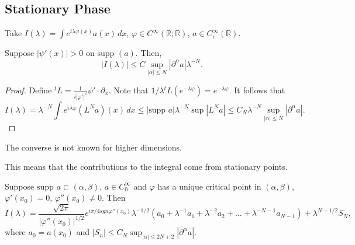 \documentclass[12pt]{scrartcl}
\newcommand{\R}{\mathbb{R}}
\newcommand{\<}{\langle}
\renewcommand{\>}{\rangle}
\let \phi \varphi
\newcommand{\supp}{\text{supp }}
\begin{document}
\subsection{Stationary Phase}
Take $I(\lambda) = \int e^{i\lambda \phi(x)} a(x)\,dx$, $\phi \in C^\infty(\R; \R)$, $a \in C_c^\infty(\R)$.  
\begin{lemma} Suppose $|\psi'(x)| > 0$ on $\supp(a)$.  Then,
$$|I(\lambda)| \le C \sup_{|\alpha| \le N} |\partial^\alpha a| \lambda^{-N}.$$
\end{lemma}
\begin{proof}
Define ${}^t L = \frac{1}{i|\phi'|^2} \psi' \cdot \partial_x$.  Note that $1/\lambda {}^t L (e^{- \lambda \phi}) = e^{- \lambda \phi}$.  It follows that $$I(\lambda) = \lambda^{-N} \int e^{i \lambda \phi} (L^N a)(x)\,dx \le |\supp a| \lambda^{-N} \sup|L^N a| \le C_N \lambda^{-N} \sup_{|\alpha| \le N} |\partial^\alpha a|.$$
\end{proof}
\begin{remark} The converse is not known for higher dimensions.  
\end{remark}
This means that the contributions to the integral come from stationary points.
\begin{theorem} Suppose $\supp a \subset (\alpha, \beta)$, $a \in C_0^\infty$ and $\phi$ has a unique critical point in $(\alpha, \beta)$, $\phi'(x_0) = 0$, $\phi''(x_0) \ne 0$.  Then $$I(\lambda) = \frac{\sqrt{2\pi}}{|\phi''(x_0)|^{1/2}} e^{i\pi/4 sgn \phi''(x_0)} \lambda^{-1/2}(a_0 + \lambda^{-1} a_1 + \lambda^{-2}a_2 + \dots + \lambda^{-N-1} a_{N - 1}) + \lambda^{N - 1/2}S_N,$$
where $a_0 = a(x_0)$ and $|S_n| \le C_N \sup_{|\alpha| \le 2N + 2} |\partial^\alpha a|$.

\end{theorem}
\end{document}
